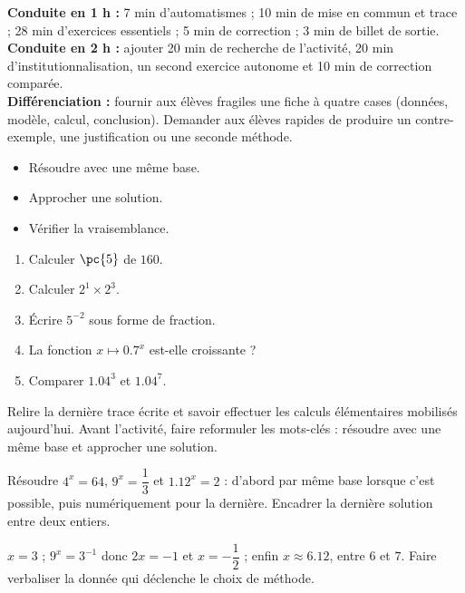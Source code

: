 \ifmxteacher
\begin{method}
\textbf{Conduite en 1 h :} 7 min d'automatismes ; 10 min de mise en commun et trace ; 28 min d'exercices essentiels ; 5 min de correction ; 3 min de billet de sortie.\\
\textbf{Conduite en 2 h :} ajouter 20 min de recherche de l'activité, 20 min d'institutionnalisation, un second exercice autonome et 10 min de correction comparée.\\
\textbf{Différenciation :} fournir aux élèves fragiles une fiche à quatre cases (données, modèle, calcul, conclusion). Demander aux élèves rapides de produire un contre-exemple, une justification ou une seconde méthode.
\end{method}
\fi
{}
\begin{objectives}\begin{itemize}\item Résoudre avec une même base.\item Approcher une solution.\item Vérifier la vraisemblance.\end{itemize}\end{objectives}
\begin{fluency}\begin{enumerate}\item Calculer $\pc{5}$ de $160$. \item Calculer $2^1\times2^3$. \item Écrire $5^{-2}$ sous forme de fraction. \item La fonction $x\mapsto\num{0,7}^x$ est-elle croissante ? \item Comparer $\num{1,04}^3$ et $\num{1,04}^7$. \end{enumerate}\end{fluency}
\begin{prerequisites}Relire la dernière trace écrite et savoir effectuer les calculs élémentaires mobilisés aujourd'hui. Avant l'activité, faire reformuler les mots-clés : résoudre avec une même base et approcher une solution.\end{prerequisites}

\begin{activity}
Résoudre $4^x=64$, $9^x=\dfrac13$ et $\num{1,12}^x=2$ : d'abord par même base lorsque c'est possible, puis numériquement pour la dernière. Encadrer la dernière solution entre deux entiers.

\end{activity}
\begin{solution}$x=3$ ; $9^x=3^{-1}$ donc $2x=-1$ et $x=-\dfrac12$ ; enfin $x\approx\num{6,12}$, entre $6$ et $7$. Faire verbaliser la donnée qui déclenche le choix de méthode.\end{solution}

